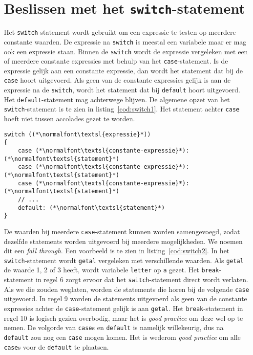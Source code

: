 \section{Beslissen met het \texttt{switch}-statement}
Het \texttt{switch}-statement wordt gebruikt om een expressie te testen op meerdere constante waarden. De expressie na \texttt{switch} is meestal een variabele maar er mag ook een expressie staan. Binnen de \texttt{switch} wordt de expressie vergeleken met een of meerdere constante expressies met behulp van het \texttt{case}-statement. Is de expressie gelijk aan een constante expressie, dan wordt het statement dat bij de \texttt{case} hoort uitgevoerd. Als geen van de constante expressies gelijk is aan de expressie na de \texttt{switch}, wordt het statement dat bij \texttt{default} hoort uitgevoerd. Het \texttt{default}-statement mag achterwege blijven. De algemene opzet van het \texttt{switch}-statement is te zien in listing~\ref{cod:switch1}. Het statement achter \texttt{case} hoeft niet tussen accolades gezet te worden.

\begin{lstlisting}[caption=Opzet van het \texttt{switch}-statment.,label=cod:switch1]
switch ((*\normalfont\textsl{expressie}*))
{
    case (*\normalfont\textsl{constante-expressie}*): (*\normalfont\textsl{statement}*)
    case (*\normalfont\textsl{constante-expressie}*): (*\normalfont\textsl{statement}*)
    case (*\normalfont\textsl{constante-expressie}*): (*\normalfont\textsl{statement}*)
    // ...
    default: (*\normalfont\textsl{statement}*)
}
\end{lstlisting}

De waarden bij meerdere \texttt{case}-statement kunnen worden samengevoegd, zodat dezelfde statements worden uitgevoerd bij meerdere mogelijkheden. We noemen dit een \textsl{fall through}. Een voorbeeld is te zien in listing~\ref{cod:switch2}. In het \texttt{switch}-statement wordt \texttt{getal} vergeleken met verschillende waarden. Als \texttt{getal} de waarde 1, 2  of 3 heeft, wordt variabele \texttt{letter} op \texttt{\textquotesingle a\textquotesingle} gezet. Het \texttt{break}-statement in regel 6 zorgt ervoor dat het \texttt{switch}-statement direct wordt verlaten. Als we die zouden weglaten, worden de statements die horen bij de volgende \texttt{case} uitgevoerd. In regel 9 worden de statements uitgevoerd als geen van de constante expressies achter de \texttt{case}-statement gelijk is aan \texttt{getal}. Het \texttt{break}-statement in regel 10 is logisch gezien overbodig, maar het is \textsl{good practice} om deze wel op te nemen. De volgorde van \texttt{case}s en \texttt{default} is namelijk willekeurig, dus na \texttt{default} zou nog een \texttt{case} mogen komen. Het is wederom \textsl{good practice} om alle \texttt{case}s voor de \texttt{default} te plaatsen.

